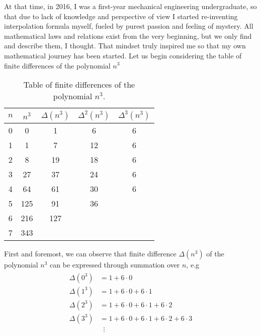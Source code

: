 At that time, in 2016, I was a first-year mechanical engineering undergraduate,
so that due to lack of knowledge and perspective of view I started re-inventing interpolation
formula myself, fueled by purest passion and feeling of mystery.
All mathematical laws and relations exist from the very beginning, but we only find and describe them, I thought.
That mindset truly inspired me so that my own mathematical journey has been started.
Let us begin considering the table of finite differences of the polynomial $n^3$
\begin{table}[H]
    \begin{center}
        \setlength\extrarowheight{-6pt}
        \begin{tabular}{c|cccc}
            $n$ & $n^3$ & $\Delta(n^3)$ & $\Delta^2(n^3)$ & $\Delta^3(n^3)$ \\
            \hline
            0   & 0     & 1             & 6               & 6               \\
            1   & 1     & 7             & 12              & 6               \\
            2   & 8     & 19            & 18              & 6               \\
            3   & 27    & 37            & 24              & 6               \\
            4   & 64    & 61            & 30              & 6               \\
            5   & 125   & 91            & 36              &                 \\
            6   & 216   & 127           &                 &                 \\
            7   & 343   &               &                 &
        \end{tabular}
    \end{center}
    \caption{Table of finite differences of the polynomial $n^3$.} \label{tab:table}
\end{table}
First and foremost, we can observe that finite difference $\Delta(n^3)$ of the polynomial $n^3$
can be expressed through summation over $n$, e.g
\begin{align}
    \label{eq:cubes_interpolation}
    \begin{split}
        \Delta(0^3) &= 1+6 \cdot 0 \\
        \Delta(1^3) &= 1+6\cdot0+6\cdot1 \\
        \Delta(2^3) &= 1+6\cdot0+6\cdot1+6\cdot2 \\
        \Delta(3^3) &= 1+6\cdot0+6\cdot1+6\cdot2+6\cdot3 \\
        &\; \; \vdots
    \end{split}
\end{align}
